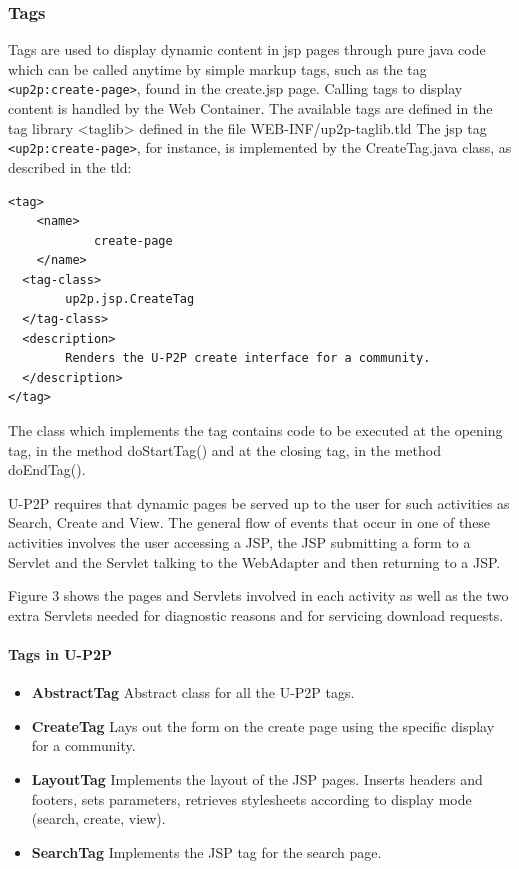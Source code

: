 \documentclass[titlepage]{article}%
\begin{document}
\subsubsection{Tags}
Tags are used to display dynamic content in jsp pages through pure java code which can be called anytime by simple markup tags, such as the tag \\ \verb.<up2p:create-page>., found in the create.jsp page. 
Calling tags to display content is handled by the Web Container. The available tags are defined in the tag library <taglib> defined in the file WEB-INF/up2p-taglib.tld
The jsp tag \verb.<up2p:create-page>., for instance, is implemented by the CreateTag.java class, as described in the tld:
\begin{verbatim}
<tag>
 	<name>
 			create-page
 	</name>
  <tag-class>
   		up2p.jsp.CreateTag
  </tag-class>
  <description>
   		Renders the U-P2P create interface for a community.
  </description>
</tag>
\end{verbatim}

The class which implements the tag contains code to be executed at the opening tag, in the method doStartTag() and at the closing tag, in the method doEndTag(). 

U-P2P requires that dynamic pages be served up to the user for such activities as Search, Create and View. The general flow of events that occur in one of these activities involves the user accessing a JSP, the JSP submitting a form to a Servlet and the Servlet talking to the WebAdapter and then returning to a JSP.

Figure 3 shows the pages and Servlets involved in each activity as well as the two extra Servlets needed for diagnostic reasons and for servicing download requests.

\paragraph{Tags in U-P2P}
\begin{itemize}
\item \textbf{AbstractTag} Abstract class for all the U-P2P tags.
\item \textbf{CreateTag} Lays out the form on the create page using the specific display for a community.
\item \textbf{LayoutTag} Implements the layout of the JSP pages. Inserts headers and footers, sets parameters, retrieves stylesheets according to display mode (search, create, view).
\item \textbf{SearchTag} Implements the JSP tag for the search page.
\end{itemize}
\end{document}

